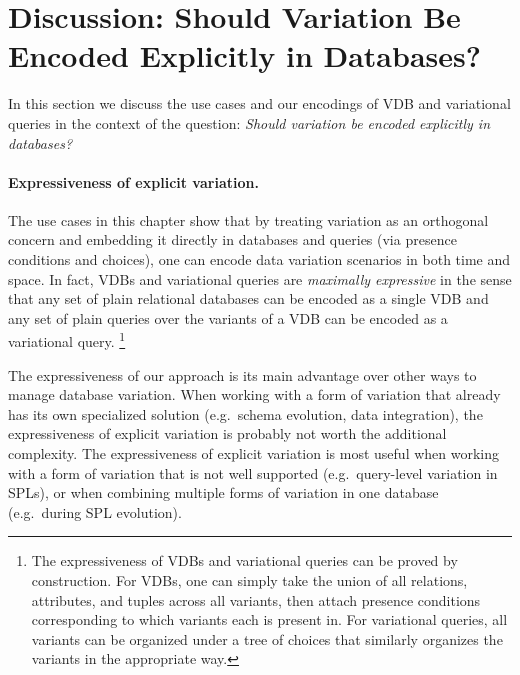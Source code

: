 \section{Discussion: Should Variation Be Encoded Explicitly in Databases?}
\label{sec:usecase-disc}

In this section we discuss the use cases and our encodings of VDB and variational queries
in the context of the question: \emph{Should
variation be encoded explicitly in databases?}


\paragraph{Expressiveness of explicit variation.}
%
The use cases in this chapter show that by treating
variation as an orthogonal concern and embedding it directly in databases and
queries (via presence conditions and choices), one can encode data variation
scenarios in both time and space.
%
In fact, VDBs and variational queries are \emph{maximally expressive} in the sense that
any set of plain relational databases can be encoded as a single VDB and any
set of plain queries over the variants of a VDB can be encoded as a variational query.%
%
\footnote{The expressiveness of VDBs and variational queries can be proved by
construction. For VDBs, one can simply take the union of all relations,
attributes, and tuples across all variants, then attach presence conditions
corresponding to which variants each is present in. For variational queries, all variants
can be organized under a tree of choices that similarly organizes the variants
in the appropriate way.}


The expressiveness of our approach is its main advantage over other ways to
manage database variation. When working with a form of variation that already
has its own specialized solution (e.g.\ schema evolution, data integration),
the expressiveness of explicit variation is probably not worth the additional
complexity.
%
The expressiveness of explicit variation is most useful when working with a
form of variation that is not well supported (e.g.\ query-level variation in
SPLs), or when combining multiple forms of variation in one database (e.g.\
during SPL evolution).


